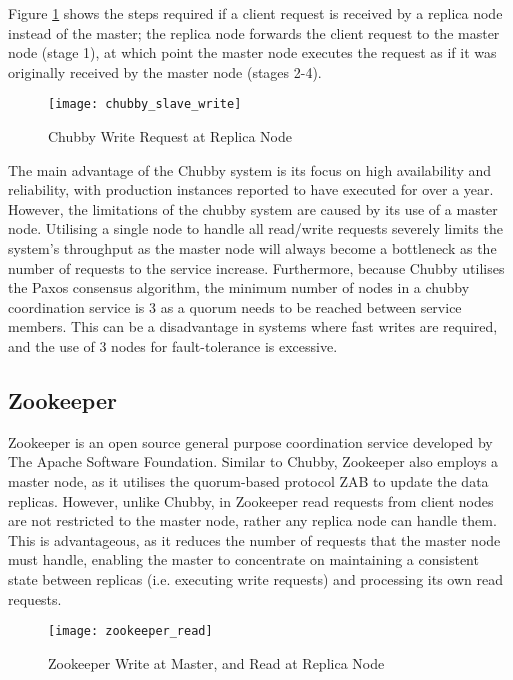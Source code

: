 Figure \ref{fig:chubby_slave_write} shows the steps required if a client request is received by a replica node instead of the master; the replica node forwards the client request to the master node (stage 1), at which point the master node executes the request as if it was originally received by the master node (stages 2-4).

	\begin{figure}[htbp!] 
	    \centering    
	    \texttt{[image: chubby\_slave\_write]}
	    \caption[Chubby Write Request at Replica Node]{Chubby Write Request at Replica Node}
	    \label{fig:chubby_slave_write}
	\end{figure}	 

The main advantage of the Chubby system is its focus on high availability and reliability, with production instances reported to have executed for over a year. However, the limitations of the chubby system are caused by its use of a master node. Utilising a single node to handle all read/write requests severely limits the system's throughput as the master node will always become a bottleneck as the number of requests to the service increase.  Furthermore, because Chubby utilises the Paxos consensus algorithm, the minimum number of nodes in a chubby coordination service is 3 as a quorum needs to be reached between service members.  This can be a disadvantage in systems where fast writes are required, and the use of 3 nodes for fault-tolerance is excessive.  
	
	\subsection{Zookeeper}
	Zookeeper\citep{Hunt:2010:ZWC:1855840.1855851} is an open source general purpose coordination service developed by The Apache Software Foundation. Similar to Chubby, Zookeeper also employs a master node, as it utilises the quorum-based protocol ZAB\citep{Junqueira:2011:ZHB:2056308.2056409} to update the data replicas.  However, unlike Chubby, in Zookeeper read requests from client nodes are not restricted to the master node, rather any replica node can handle them.  This is advantageous, as it reduces the number of requests that the master node must handle, enabling the master to concentrate on maintaining a consistent state between replicas (i.e. executing write requests) and processing its own read requests.  
	
\begin{figure}[htbp!] 
	    \centering    
	    \texttt{[image: zookeeper\_read]}
	    \caption[Zookeeper Read and Write Requests]{Zookeeper Write at Master, and Read at Replica Node}
	    \label{fig:zookeeper_read}
	\end{figure}	 	
	
